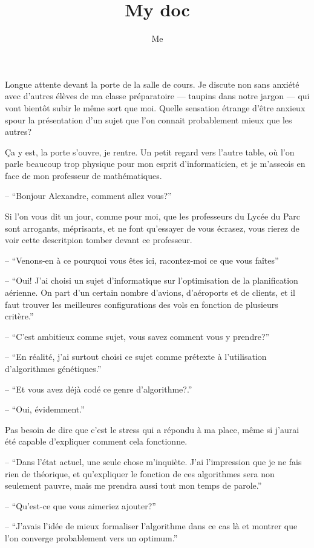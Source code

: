 \documentclass[letterpaper, 12pt]{article} %
\title{My doc}
\author{Me}
\begin{document}
  \doublespacing{}

{
Longue attente devant la porte de la salle de cours. 
Je discute non sans anxiété avec d'autres élèves de ma classe préparatoire --- taupins dans notre jargon --- qui vont bientôt subir le même sort que moi.
Quelle sensation étrange d'être anxieux spour la présentation d'un sujet que l'on connait probablement mieux que les autres?

Ça y est, la porte s'ouvre, je rentre. Un petit regard vers l'autre table, où l'on parle beaucoup trop physique pour mon esprit d'informaticien, et je m'asseois en face de mon professeur de mathématiques.

-- ``Bonjour Alexandre, comment allez vous?''

Si l'on vous dit un jour, comme pour moi, que les professeurs du Lycée du Parc sont arrogants, méprisants, et ne font qu'essayer de vous écrasez, vous rierez de voir cette descritpion tomber devant ce professeur.


-- ``Venons-en à ce pourquoi vous êtes ici, racontez-moi ce que vous faîtes''

-- ``Oui! J'ai choisi un sujet d'informatique sur l'optimisation de la planification aérienne. On part d'un certain nombre d'avions, d'aéroports et de clients, et il faut trouver les meilleures configurations des vols en fonction de plusieurs critère.''

-- ``C'est ambitieux comme sujet, vous savez comment vous y prendre?'' %

-- ``En réalité, j'ai surtout choisi ce sujet comme prétexte à l'utilisation d'algorithmes génétiques.''

-- ``Et vous avez déjà codé ce genre d'algorithme?.''

-- ``Oui, évidemment.''

Pas besoin de dire que c'est le stress qui a répondu à ma place, même si j'aurai été capable d'expliquer comment cela fonctionne. 

-- ``Dans l'état actuel, une seule chose m'inquiète. 
		J'ai l'impression que je ne fais rien de théorique, et qu'expliquer le fonction de ces algorithmes sera non seulement pauvre, mais me prendra aussi tout mon temps de parole.''

-- ``Qu'est-ce que vous aimeriez ajouter?''

-- ``J'avais l'idée de mieux formaliser l'algorithme dans ce cas là et montrer que l'on converge probablement vers un optimum.''

}
\end{document}
